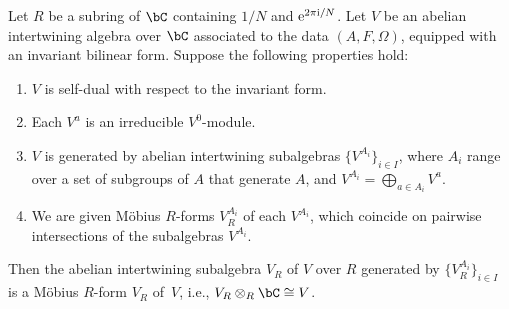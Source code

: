 \begin{prop} \label{prop:existence-of-R-form-of-abelian-intertwining-algebra} Let $R$ be a subring of $\bC$ containing $1/N$ and ${\rm e}^{2\pi {\rm i}/N}$. Let $V$ be an abelian intertwining algebra over $\bC$ associated to the data $(A,F,\Omega)$, equipped with an invariant bilinear form. Suppose the following properties hold:
\begin{enumerate}\itemsep=0pt
\item[$1.$] $V$ is self-dual with respect to the invariant form.
\item[$2.$] Each $V^a$ is an irreducible $V^0$-module.
\item[$3.$] $V$ is generated by abelian intertwining subalgebras $\big\{V^{A_i}\big\}_{i \in I}$, where $A_i$ range over a set of subgroups of $A$ that generate $A$, and $V^{A_i} = \bigoplus_{a \in A_i} V^a$.
\item[$4.$] We are given M\"obius $R$-forms $V^{A_i}_R$ of each $V^{A_i}$, which coincide on pairwise intersections of the subalgebras $V^{A_i}$.
\end{enumerate}
Then the abelian intertwining subalgebra $V_R$ of $V$ over $R$ generated by $\big\{ V^{A_i}_R \big\}_{i \in I}$ is a M\"obius $R$-form $V_R$ of~$V$, i.e., $V_R \otimes_{R} \bC \cong V$.
\end{prop}
